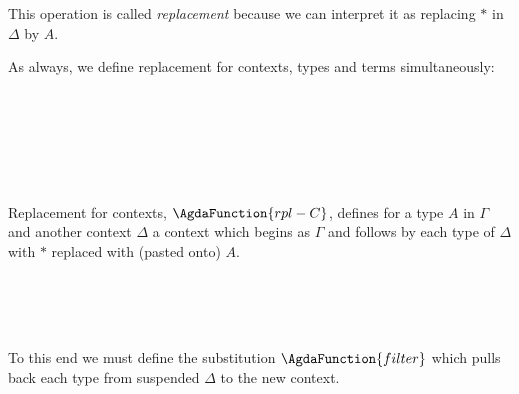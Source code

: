 This operation is called \emph{replacement} because we can interpret it as replacing $*$ in $\Delta$ by
$A$.

As always, we define replacement for contexts, types and terms simultaneously:

\begin{code}\>\<%
\\
\> \<[8]%
\>[8]\AgdaSymbol{:} \AgdaSymbol{\}(} \AgdaSymbol{:}  \AgdaSymbol{)}    \<%
\\
\> \<[8]%
\>[8]\AgdaSymbol{:}  \AgdaSymbol{\}(} \AgdaSymbol{:}  \AgdaSymbol{)}      \AgdaSymbol{(}  \AgdaSymbol{)}\<%
\\
\> \<[8]%
\>[8]\AgdaSymbol{:}  \AgdaSymbol{\}(} \AgdaSymbol{:}  \AgdaSymbol{)\{} \AgdaSymbol{:}  \AgdaSymbol{\}}    \<[44]%
\>[44]\<%
\\
\>[0]\<[8]%
\>[8]  \AgdaSymbol{(}  \AgdaSymbol{)}\<%
\\
\>\<\end{code}
Replacement for contexts, $\AgdaFunction{rpl-C}$, defines for a type $A$ in $\Gamma$ and another context $\Delta$ 
a context which begins as $\Gamma$ and follows by each type of $\Delta$ with $*$ replaced with (pasted onto)  $A$. 

\begin{code}\>\<%
\\
\> \AgdaSymbol{\{}\AgdaSymbol{\}}   \<[17]%
\>[17]\AgdaSymbol{=} \<%
\\
\>  \AgdaSymbol{(} \AgdaInductiveConstructor{,} \AgdaSymbol{)} \<[17]%
\>[17]\AgdaSymbol{=}    \AgdaInductiveConstructor{,}   \<%
\\
\>\<\end{code}
\noindent To this end we must define the substitution $\AgdaFunction{filter}$ which
pulls back each type from suspended $\Delta$ to the new context. 

